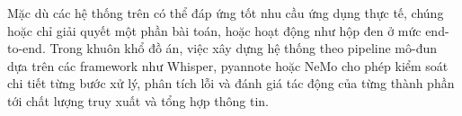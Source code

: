 Mặc dù các hệ thống trên có thể đáp ứng tốt nhu cầu ứng dụng thực tế, chúng hoặc chỉ giải quyết một phần bài toán, hoặc hoạt động như hộp đen ở mức end-to-end. Trong khuôn khổ đồ án, việc xây dựng hệ thống theo pipeline mô-đun dựa trên các framework như Whisper, pyannote hoặc NeMo cho phép kiểm soát chi tiết từng bước xử lý, phân tích lỗi và đánh giá tác động của từng thành phần tới chất lượng truy xuất và tổng hợp thông tin.
